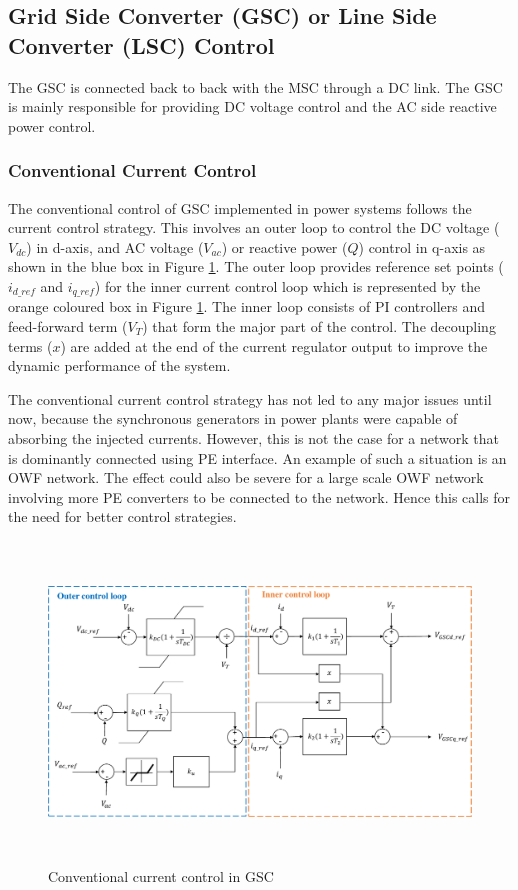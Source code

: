 \subsection{Grid Side Converter (GSC) or Line Side Converter (LSC) Control}
The \gls{GSC} is connected back to back with the \gls{MSC} through a \gls{DC} link. The \gls{GSC} is mainly responsible for providing \gls{DC} voltage control and the \gls{AC} side reactive power control. 

\subsubsection{Conventional Current Control}\label{conv_current_control}
The conventional control of \gls{GSC} implemented in power systems follows the current control strategy. This involves an outer loop to control the \gls{DC} voltage ($V_{dc}$) in d-axis, and \gls{AC} voltage ($V_{ac}$) or reactive power ($Q$) control in q-axis as shown in the blue box in Figure \ref{fig:Diss_GSC_control}. The outer loop provides reference set points ($i_{d\_ref}$ and $i_{q\_ref}$) for the inner current control loop which is represented by the orange coloured box in Figure \ref{fig:Diss_GSC_control}. The inner loop consists of \gls{PI} controllers and feed-forward term ($V_T$) that form the major part of the control. The decoupling terms ($x$) are added at the end of the current regulator output to improve the dynamic performance of the system.  

The conventional current control strategy has not led to any major issues until now, because the synchronous generators in power plants were capable of absorbing the injected currents. However, this is not the case for a network that is dominantly connected using \gls{PE} interface. An example of such a situation is an \gls{OWF} network. The effect could also be severe for a large scale \gls{OWF} network involving more \gls{PE} converters to be connected to the network. Hence this calls for the need for better control strategies.

\begin{figure}[H]
\centering
    \includegraphics[height = 8.5cm,width = 15.5cm]{Diagrams/Chapter_2/Inner_control_GSC_chap2.pdf}
    \caption{Conventional current control in GSC \cite{korai_dynamic_2019}}
    \label{fig:Diss_GSC_control}
\end{figure}


